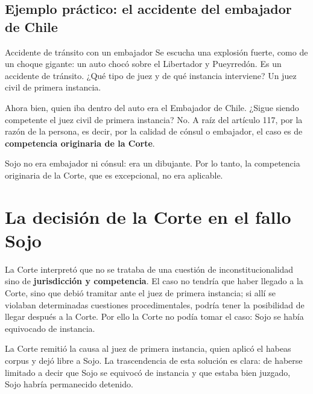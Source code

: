 \documentclass[12pt,oneside,a4paper]{book}
\begin{document}
\subsection{Ejemplo práctico: el accidente del embajador de Chile}

\begin{example}{Accidente de tránsito con un embajador}
Se escucha una explosión fuerte, como de un choque gigante: un auto chocó sobre el Libertador y Pueyrredón. Es un accidente de tránsito. ¿Qué tipo de juez y de qué instancia interviene? Un juez civil de primera instancia.

Ahora bien, quien iba dentro del auto era el Embajador de Chile. ¿Sigue siendo competente el juez civil de primera instancia? No. A raíz del artículo 117, por la razón de la persona, es decir, por la calidad de cónsul o embajador, el caso es de \textbf{competencia originaria de la Corte}.
\end{example}

Sojo no era embajador ni cónsul: era un dibujante. Por lo tanto, la competencia originaria de la Corte, que es excepcional, no era aplicable.

\section{La decisión de la Corte en el fallo Sojo}

La Corte interpretó que no se trataba de una cuestión de inconstitucionalidad sino de \textbf{jurisdicción y competencia}. El caso no tendría que haber llegado a la Corte, sino que debió tramitar ante el juez de primera instancia; si allí se violaban determinadas cuestiones procedimentales, podría tener la posibilidad de llegar después a la Corte. Por ello la Corte no podía tomar el caso: Sojo se había equivocado de instancia.

La Corte remitió la causa al juez de primera instancia, quien aplicó el habeas corpus y dejó libre a Sojo. La trascendencia de esta solución es clara: de haberse limitado a decir que Sojo se equivocó de instancia y que estaba bien juzgado, Sojo habría permanecido detenido.
\end{document}
